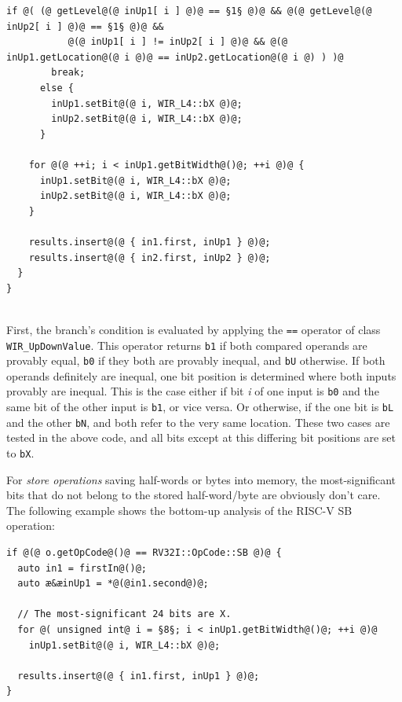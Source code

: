 \begin{enumerate}[resume]
\begin{lstlisting}[style=code,float=!ht,xleftmargin=10mm,belowskip=-0.8 \baselineskip]
      if @( (@ getLevel@(@ inUp1[ i ] @)@ == §1§ @)@ && @(@ getLevel@(@ inUp2[ i ] @)@ == §1§ @)@ &&
           @(@ inUp1[ i ] != inUp2[ i ] @)@ && @(@ inUp1.getLocation@(@ i @)@ == inUp2.getLocation@(@ i @) ) )@
        break;
      else {
        inUp1.setBit@(@ i, WIR_L4::bX @)@;
        inUp2.setBit@(@ i, WIR_L4::bX @)@;
      }

    for @(@ ++i; i < inUp1.getBitWidth@()@; ++i @)@ {
      inUp1.setBit@(@ i, WIR_L4::bX @)@;
      inUp2.setBit@(@ i, WIR_L4::bX @)@;
    }

    results.insert@(@ { in1.first, inUp1 } @)@;
    results.insert@(@ { in2.first, inUp2 } @)@;
  }
}
\end{lstlisting}
  \\
  First, the branch's condition is evaluated by applying the \texttt{==} operator of class \texttt{WIR\_UpDownValue}.
  This operator returns \texttt{b1} if both compared operands are provably equal, \texttt{b0} if they both are provably inequal, and \texttt{bU} otherwise.
  If both operands definitely are inequal, one bit position is determined where both inputs provably are inequal.
  This is the case either if bit \emph{i} of one input is \texttt{b0} and the same bit of the other input is \texttt{b1}, or vice versa.
  Or otherwise, if the one bit is \texttt{bL} and the other \texttt{bN}, and both refer to the very same location.
  These two cases are tested in the above code, and all bits except at this differing bit positions are set to \texttt{bX}.

  For \emph{store operations} saving half-words or bytes into memory, the most-significant bits that do not belong to the stored half-word/byte are obviously don't care.
  The following example shows the bottom-up analysis of the RISC-V SB operation: \\
\begin{lstlisting}[style=code,float=!h,xleftmargin=10mm,aboveskip=-0.8 \baselineskip,belowskip=-0.8 \baselineskip]
if @(@ o.getOpCode@()@ == RV32I::OpCode::SB @)@ {
  auto in1 = firstIn@()@;
  auto æ&æinUp1 = *@(@in1.second@)@;

  // The most-significant 24 bits are X.
  for @( unsigned int@ i = §8§; i < inUp1.getBitWidth@()@; ++i @)@
    inUp1.setBit@(@ i, WIR_L4::bX @)@;

  results.insert@(@ { in1.first, inUp1 } @)@;
}
\end{lstlisting}
\end{enumerate}

\cleardoubleoddpage
